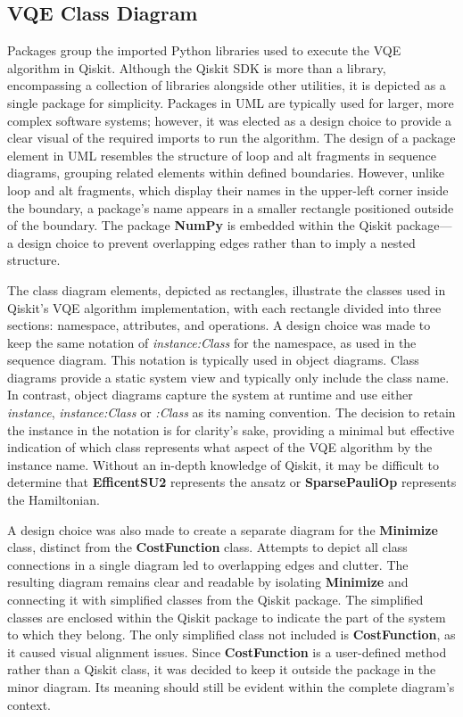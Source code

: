 \documentclass{article}
\begin{document}
\subsection{VQE Class Diagram}

Packages group the imported Python libraries used to execute the VQE algorithm in Qiskit. Although the Qiskit SDK is more than a library, encompassing a collection of libraries alongside other utilities\cite{SheriefAbul-Ezz}, it is depicted as a single package for simplicity. Packages in UML are typically used for larger, more complex software systems\cite{VisualParadigm}; however, it was elected as a design choice to provide a clear visual of the required imports to run the algorithm. The design of a package element in UML resembles the structure of loop and alt fragments in sequence diagrams, grouping related elements within defined boundaries. However, unlike loop and alt fragments, which display their names in the upper-left corner inside the boundary, a package’s name appears in a smaller rectangle positioned outside of the boundary. The package \textbf{NumPy} is embedded within the Qiskit package—a design choice to prevent overlapping edges rather than to imply a nested structure.

The class diagram elements, depicted as rectangles, illustrate the classes used in Qiskit’s VQE algorithm implementation, with each rectangle divided into three sections: namespace, attributes, and operations. A design choice was made to keep the same notation of \textit{instance:Class} for the namespace, as used in the sequence diagram. This notation is typically used in object diagrams. Class diagrams provide a static system view and typically only include the class name. In contrast, object diagrams capture the system at runtime and use either \textit{instance}, \textit{instance:Class} or \textit{:Class} as its naming convention\cite{Seidl_Scholz_Huemer_Kappel_Duffy_2014}. The decision to retain the instance in the notation is for clarity's sake, providing a minimal but effective indication of which class represents what aspect of the VQE algorithm by the instance name. Without an in-depth knowledge of Qiskit, it may be difficult to determine that \textbf{EfficentSU2} represents the ansatz or \textbf{SparsePauliOp} represents the Hamiltonian.

A design choice was also made to create a separate diagram for the \textbf{Minimize} class, distinct from the \textbf{CostFunction} class. Attempts to depict all class connections in a single diagram led to overlapping edges and clutter. The resulting diagram remains clear and readable by isolating \textbf{Minimize} and connecting it with simplified classes from the Qiskit package. The simplified classes are enclosed within the Qiskit package to indicate the part of the system to which they belong. The only simplified class not included is \textbf{CostFunction}, as it caused visual alignment issues. Since \textbf{CostFunction} is a user-defined method rather than a Qiskit class, it was decided to keep it outside the package in the minor diagram. Its meaning should still be evident within the complete diagram's context.
\end{document}
